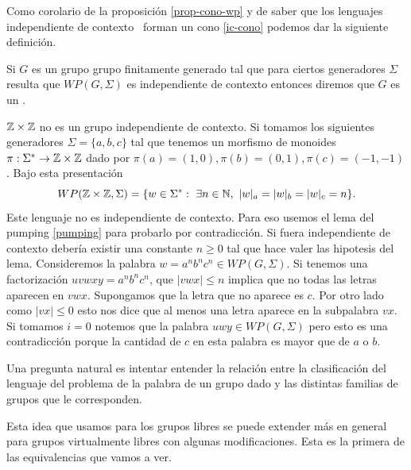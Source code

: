 \documentclass[tesis.tex]{subfiles}
\newcommand{\ic}{independiente de contexto }
\newcommand{\fg}{grupo finitamente generado }
\begin{document}
Como corolario de la proposición \ref{prop-cono-wp} y de saber que los lenguajes \ic \ forman un cono \ref{ic-cono} podemos dar la siguiente definición.
\medskip
\begin{deff}
	Si $G$ es un grupo \fg tal que para ciertos generadores $\Sigma$ resulta que $WP(G, \Sigma)$ es independiente de contexto entonces diremos que $G$ es un \blue{grupo \ic }.
\end{deff}

\begin{ej}
	$\mathbb{Z} \times \mathbb{Z}$ no es un grupo independiente de contexto.
	Si tomamos los siguientes generadores $\Sigma = \{ a,b,c \}$ tal que tenemos un morfismo de monoides $\pi: \Sigma^* \to \mathbb{Z} \times \mathbb{Z}$ dado por $\pi(a)=(1,0), \pi(b)=(0,1), \pi(c)=(-1,-1)$.
	Bajo esta presentación 
	\[
	WP(\mathbb{Z} \times \mathbb{Z}, \Sigma) = \{ w \in \Sigma^*  : \ \exists n \in \mathbb{N}, \ |w|_a = |w|_b = |w|_c = n \}.
	\]
	Este lenguaje no es independiente de contexto.
	Para eso usemos el lema del pumping \ref{pumping} para probarlo por contradicción.
	Si fuera \ic debería existir una constante $n \ge 0$ tal que hace valer las hipotesis del lema.
	Consideremos la palabra $w = a^n b^n c^n \in WP(G, \Sigma)$.
	Si tenemos una factorización $uvwxy = a^nb^nc^n$, que $|vwx| \le n$ implica que no todas las letras aparecen en $vwx$.
	Supongamos que la letra que no aparece es $c$.
	Por otro lado como $|vx| \le 0$ esto nos dice que al menos una letra aparece en la subpalabra $vx$.
	Si tomamos $i=0$ notemos que la palabra $uwy \in WP(G,\Sigma)$ pero esto es una contradicción porque la cantidad de $c$ en esta palabra es mayor que de $a$ o $b$.
\end{ej}

Una pregunta natural es intentar entender la relación entre la clasificación del lenguaje del problema de la palabra de un grupo dado y las distintas familias de grupos que le corresponden. 



Esta idea que usamos para los grupos libres se puede extender más en general para grupos virtualmente libres con algunas modificaciones. Esta es la primera de las equivalencias que vamos a ver.
\end{document}
